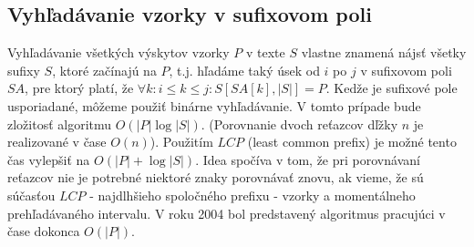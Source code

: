     \subsection{Vyhľadávanie vzorky v sufixovom poli}
    Vyhľadávanie všetkých výskytov vzorky $P$ v texte $S$ vlastne znamená nájsť
    všetky sufixy $S$, ktoré začínajú na $P$, t.j. hľadáme taký úsek od $i$ po
    $j$ v sufixovom poli $SA$, pre ktorý platí, že
    $\forall k: i \leq k \leq j: S[SA[k], \lvert S \rvert] = P$. Kedže je
    sufixové pole usporiadané, môžeme použiť binárne vyhľadávanie. V tomto
    prípade bude zložitosť algoritmu $O(\lvert P \rvert \log \lvert S \rvert)$.
    (Porovnanie dvoch reťazcov dľžky $n$ je realizované v čase $O(n)$). Použitím
    $LCP$ (least common prefix) je možné tento čas vylepšiť na $O(\lvert P
    \rvert + \log{\lvert S \rvert})$. Idea spočíva v tom, že pri porovnávaní
    reťazcov nie je potrebné niektoré znaky porovnávať znovu, ak vieme, že sú
    súčasťou $LCP$ - najdlhšieho spoločného prefixu - vzorky a momentálneho
    prehľadávaného intervalu. V roku 2004 bol predstavený algoritmus
    \cite{AKO04} pracujúci v čase dokonca $O(\lvert P \rvert)$.
    
